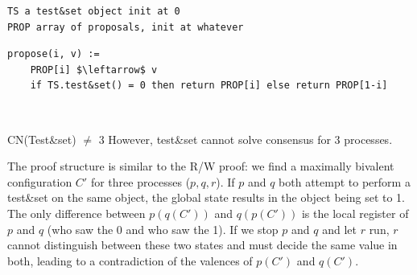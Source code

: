 \begin{minipage}{\textwidth}
\begin{lstlisting}[mathescape]
TS a test&set object init at 0
PROP array of proposals, init at whatever
\end{lstlisting}
\begin{lstlisting}[mathescape]
propose(i, v) :=
    PROP[i] $\leftarrow$ v
    if TS.test&set() = 0 then return PROP[i] else return PROP[1-i]
\end{lstlisting}
\end{minipage}\\

\begin{Thm}{CN(Test\&set) $\neq$ 3}{}
However, test\&set cannot solve consensus for 3 processes. 
\begin{demonstration}
The proof structure is similar to the R/W proof: we find a maximally bivalent configuration $C'$ for three processes ($p,q,r$). If $p$ and $q$ both attempt to perform a test\&set on the same object, the global state results in the object being set to 1. The only difference between $p(q(C'))$ and $q(p(C'))$ is the local register of $p$ and $q$ (who saw the 0 and who saw the 1). If we stop $p$ and $q$ and let $r$ run, $r$ cannot distinguish between these two states and must decide the same value in both, leading to a contradiction of the valences of $p(C')$ and $q(C')$.
\end{demonstration}
\end{Thm}


